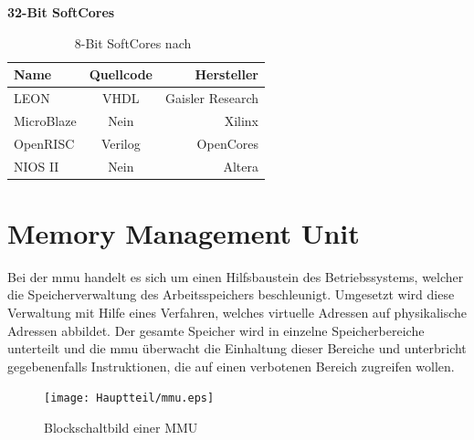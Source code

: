     \textbf{32-Bit SoftCores}\\
    \begin{table}[H]
    \centering
    \begin{tabular}{|l|c|r|}
      \hline
    \textbf{Name} & \textbf{Quellcode} & \textbf{Hersteller}\\
      \hline
      LEON & VHDL & Gaisler Research\\
      \hline
      MicroBlaze & Nein & Xilinx\\
      \hline
      OpenRISC & Verilog & OpenCores\\
      \hline
      NIOS II & Nein & Altera\\
      \hline
    \end{tabular}
      \caption{8-Bit SoftCores nach~\cite{softcore}}
     \label{tab:8bitsysteme}
      \end{table}










\section{Memory Management Unit}\label{kap:mmu}

Bei der \ac{mmu} handelt es sich um einen Hilfsbaustein des Betriebssystems, welcher die Speicherverwaltung des Arbeitsspeichers beschleunigt. Umgesetzt wird diese Verwaltung mit
Hilfe eines Verfahren, welches virtuelle Adressen auf physikalische Adressen abbildet. Der gesamte Speicher wird in einzelne Speicherbereiche unterteilt und die
\ac{mmu} überwacht die Einhaltung dieser Bereiche und unterbricht gegebenenfalls Instruktionen, die auf einen verbotenen
Bereich zugreifen wollen.\cite{itwissen}\\

\begin{figure}[H]
\centering
\texttt{[image: Hauptteil/mmu.eps]}
\caption{Blockschaltbild einer MMU}\label{fig:mmu}
\end{figure}


